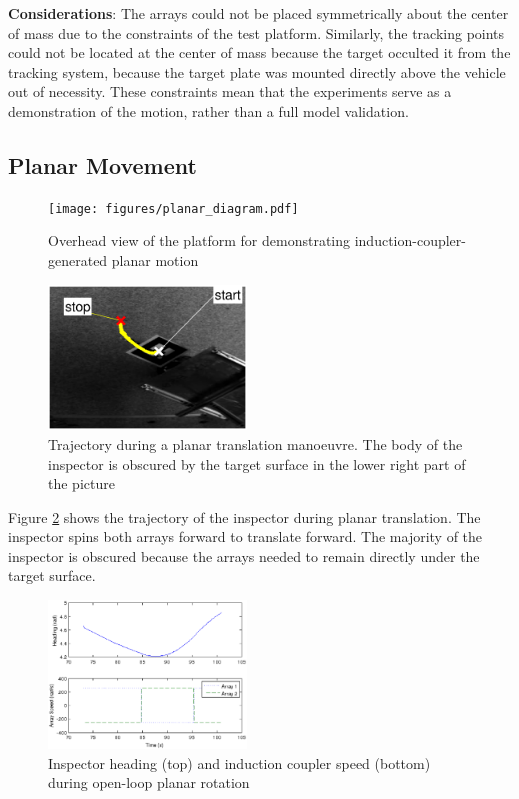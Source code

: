 \documentclass[letterpaper, 10 pt, conference]{ieeeconf}  %
\begin{document}
\par \textbf{Considerations}: The arrays could not be placed symmetrically about the center of mass due to the constraints of the test platform. Similarly, the tracking points could not be located at the center of mass because the target occulted it from the tracking system, because the target plate was mounted directly above the vehicle out of necessity. These constraints mean that the experiments serve as a demonstration of the motion, rather than a full model validation.  


\subsection{Planar Movement}\label{sec:planar_movement_exp}
   \begin{figure}[thpb]
      \centering
      \texttt{[image: figures/planar\_diagram.pdf]}
      \caption{Overhead view of the platform for demonstrating induction-coupler-generated planar motion}
      \label{fig:planar_translation_exp_diagram}
   \end{figure}
  
  
   \begin{figure}[thpb]
      \centering
      \includegraphics[width = 0.47\textwidth]{figures/planar_translation.eps}
      \caption{Trajectory during a planar translation manoeuvre. The body of the inspector is obscured by the target surface in the lower right part of the picture}
      \label{fig:planar_translation_exp_trajectory}
   \end{figure}

   
   \par Figure \ref{fig:planar_translation_exp_trajectory} shows the trajectory of the inspector during planar translation. The inspector spins both arrays forward to translate forward. The majority of the inspector is obscured because the arrays needed to remain directly under the target surface.
   

      \begin{figure}[thpb]
      \centering
      \includegraphics[width = 0.47\textwidth]{figures/planar_rotation.eps}
      \caption{Inspector heading (top) and induction coupler speed (bottom) during open-loop planar rotation}
      \label{fig:planar_rotation_exp}
   \end{figure}
   
\end{document}
